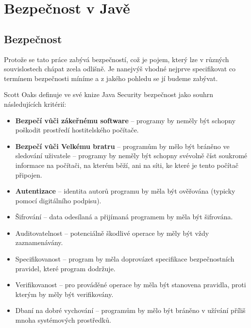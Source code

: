 \chapter{Bezpečnost v Javě} \label{teoretickyUvod}

\section{Bezpečnost}

Protože se tato práce zabývá bezpečností, což je pojem, který lze v různých souvislostech chápat zcela odlišně. Je nanejvýš vhodné nejprve specifikovat co termínem bezpečnosti míníme a z jakého pohledu se jí budeme zabývat.

Scott Oaks definuje ve své knize Java Security bezpečnost jako souhrn následujících kritérií: \cite[1.1]{oaks}

\begin{itemize}
  \item {\bf Bezpečí vůči zákeřnému software} -- programy by neměly být schopny poškodit prostředí hostitelského počítače.
  \item {\bf Bezpečí vůči Velkému bratru} -- programům by mělo být bráněno ve sledování uživatele -- programy by neměly být schopny svévolně číst soukromé informace na počítači, na kterém běží, ani na síti, ke které je tento počítač připojen.
  \item {\bf Autentizace} -- identita autorů programu by měla být ověřována (typicky pomocí digitálního podpisu).
  \item Šifrování -- data odesílaná a přijímaná programem by měla být šifrována.
  \item Auditovatelnost -- potenciálně škodlivé operace by měly být vždy zaznamenávány.
  \item Specifikovanost -- program by měla doprovázet specifikace bezpečnostních pravidel, které program dodržuje.
  \item Verifikovanost -- pro prováděné operace by měla být stanovena pravidla, proti kterým by měly být verifikovány.
  \item Dbaní na dobré vychování -- programům by mělo být bráněno v užívání příliš mnoha systémových prostředků.
\end{itemize}

